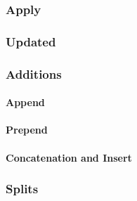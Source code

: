 
\subsubsection{Apply}


\subsubsection{Updated}



\subsubsection{Additions}

\paragraph{Append}

\paragraph{Prepend}

\paragraph{Concatenation and Insert}



\subsubsection{Splits}


